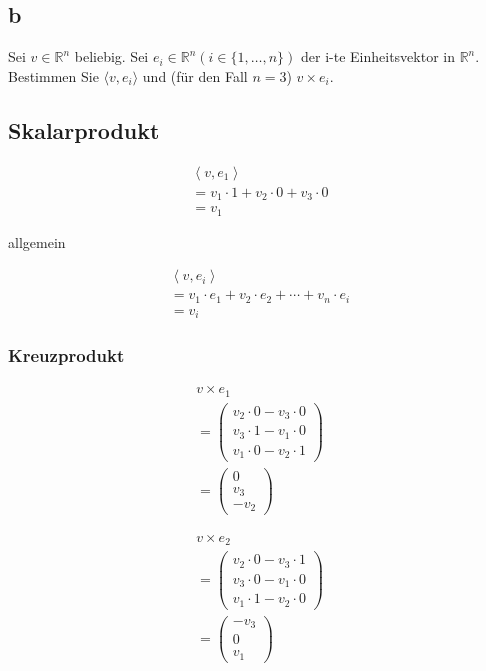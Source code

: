 \subsection{b}
Sei $v \in \mathbb{R}^n$ beliebig. Sei $e_i \in \mathbb{R}^n (i \in \{1, \dots, n\})$ der i-te Einheitsvektor in $\mathbb{R}^n$. Bestimmen Sie $\langle v, e_i \rangle$ und (für den Fall $n = 3$) $v \times e_i$.

\subsection*{Skalarprodukt}

\begin{align*}
    \left\langle v, e_1 \right\rangle \\
    = v_1 \cdot 1 + v_2 \cdot 0 + v_3 \cdot 0\\
    = v_1
\end{align*}

allgemein

\begin{align*}
    \left\langle v, e_i \right\rangle \\
    = v_1 \cdot e_1 + v_2 \cdot e_2 + \cdots + v_n \cdot e_i\\
    = v_i
\end{align*}

\subsubsection*{Kreuzprodukt}
\begin{align*}
    v \times e_1 \\
    = \begin{pmatrix}
        v_2 \cdot 0 - v_3 \cdot 0 \\
        v_3 \cdot 1 - v_1 \cdot 0 \\
        v_1 \cdot 0 - v_2 \cdot 1
    \end{pmatrix} \\
    = \begin{pmatrix}
        0 \\ v_3 \\ -v_2
    \end{pmatrix}
\end{align*}

\begin{align*}
    v \times e_2 \\
    = \begin{pmatrix}
        v_2 \cdot 0 - v_3 \cdot 1 \\
        v_3 \cdot 0 - v_1 \cdot 0 \\
        v_1 \cdot 1 - v_2 \cdot 0
    \end{pmatrix} \\
    = \begin{pmatrix}
        -v_3 \\ 0 \\ v_1
    \end{pmatrix}
\end{align*}

